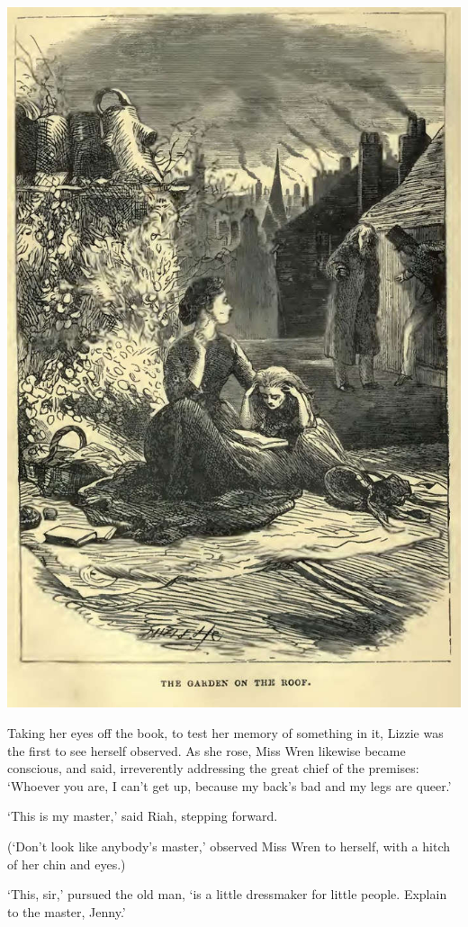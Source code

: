 \includegraphics[scale=2.3]{02-05-01}

Taking her eyes off the book, to test her memory of something in it,
Lizzie was the first to see herself observed. As she rose, Miss Wren
likewise became conscious, and said, irreverently addressing the great
chief of the premises: ‘Whoever you are, I can’t get up, because my
back’s bad and my legs are queer.’

‘This is my master,’ said Riah, stepping forward.

(‘Don’t look like anybody’s master,’ observed Miss Wren to herself, with
a hitch of her chin and eyes.)

‘This, sir,’ pursued the old man, ‘is a little dressmaker for little
people. Explain to the master, Jenny.’


